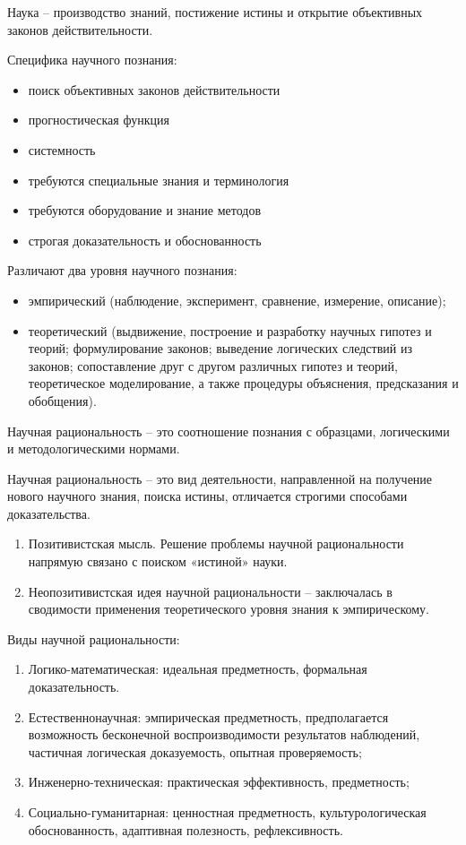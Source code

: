 
Наука -- производство знаний, постижение истины и открытие объективных законов действительности.

Специфика научного познания:
\begin{itemize}
	\item поиск объективных законов действительности
	\item прогностическая функция
	\item системность
	\item требуются специальные знания и терминология
	\item требуются оборудование и знание методов
	\item строгая доказательность и обоснованность
\end{itemize}

Различают два уровня научного познания:
\begin{itemize}
	\item эмпирический (наблюдение, эксперимент, сравнение, измерение, описание);
	\item теоретический (выдвижение, построение и разработку научных гипотез и теорий; формулирование законов; выведение логических следствий из законов; сопоставление друг с другом различных гипотез и теорий, теоретическое моделирование, а также процедуры объяснения, предсказания и обобщения).
\end{itemize}

Научная рациональность – это соотношение познания с образцами, логическими и методологическими нормами.

Научная рациональность – это вид деятельности, направленной на получение нового научного знания, поиска истины, отличается строгими способами доказательства.

\begin{enumerate}
	\item Позитивистская мысль. Решение проблемы научной рациональности напрямую связано с поиском «истиной» науки.
	\item Неопозитивистская идея научной рациональности – заключалась в сводимости применения теоретического уровня знания к эмпирическому.
\end{enumerate}

Виды научной рациональности:
\begin{enumerate}
	\item Логико-математическая: идеальная предметность, формальная доказательность.
	\item Естественнонаучная: эмпирическая предметность, предполагается возможность бесконечной воспроизводимости результатов наблюдений, частичная логическая доказуемость, опытная проверяемость;
	\item Инженерно-техническая: практическая эффективность, предметность;
	\item Социально-гуманитарная: ценностная предметность, культурологическая обоснованность, адаптивная полезность, рефлексивность.
\end{enumerate}

